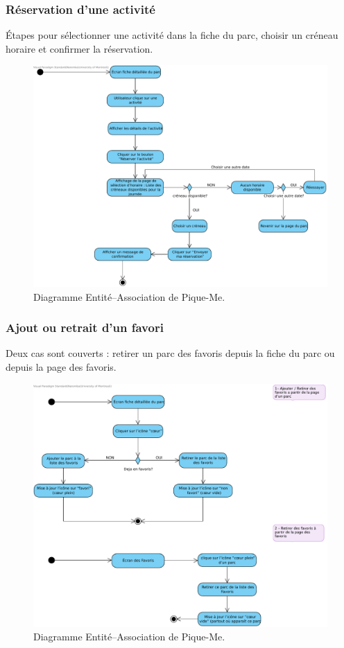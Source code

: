 \documentclass[12pt,a4paper]{article}
\begin{document}
\subsubsection{Réservation d'une activité}

Étapes pour sélectionner une activité dans la fiche du parc, choisir un créneau horaire et confirmer la réservation.

\begin{figure}[h!]
  \centering
  \includegraphics[width=0.9\linewidth]{attachments/Reservation_Activite.pdf}
  \caption{Diagramme Entité–Association de Pique-Me.}
\end{figure}

\subsubsection{Ajout ou retrait d'un favori}

Deux cas sont couverts : retirer un parc des favoris depuis la fiche du parc ou depuis la page des favoris.

\begin{figure}[h!]
  \centering
  \includegraphics[width=0.9\linewidth]{attachments/Ajout_retrait_d_un_favori.pdf}
  \caption{Diagramme Entité–Association de Pique-Me.}
\end{figure}
\end{document}
